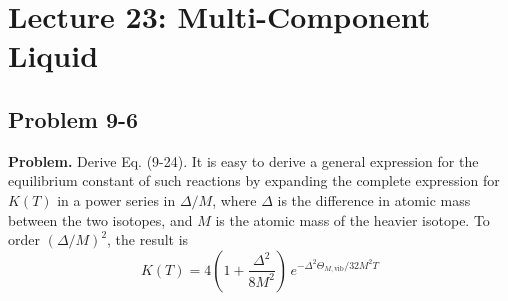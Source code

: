 \documentclass[twocolumn, 10pt]{article}
\numberwithin{equation}{section}
\newenvironment{problem}
{\par\medskip \color{problemblue}
  \textbf{Problem. }\ignorespaces}
{\medskip}
\begin{document}
\section{Lecture 23: Multi-Component Liquid }

\subsection{Problem 9-6}

\begin{problem}
Derive Eq. (9-24).
It is easy to derive a general expression
for the equilibrium constant of such reactions
by expanding the complete expression for $K(T)$
in a power series in $\Delta/M$,
where $\Delta$ is the difference
in atomic mass between the two isotopes,
and $M$ is the atomic mass of the heavier isotope.
To order $(\Delta/M)^2$, the result is
\begin{equation}
  K(T)
  =
  4\left( 1 + \frac{\Delta^2}{8M^2} \right)
  \, e^{-\Delta^2 \Theta_{M,\mathrm{vib}}/32M^2T}
  \tag{9-24}
  \label{eq:K_iso_MDelta}
\end{equation}
\end{problem}
\end{document}
